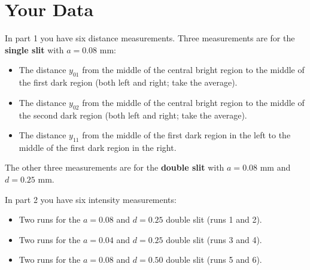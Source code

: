 \section{Your Data}
In part 1 you have six distance measurements. Three measurements are for the \textbf{single slit} with $a = 0.08$ mm:
\begin{itemize}
	\item The distance $y_{01}$ from the middle of the central bright region to the middle of the first dark region (both left and right; take the average).
	\item The distance $y_{02}$ from the middle of the central bright region to the middle of the second dark region (both left and right; take the average).
	\item The distance $y_{11}$ from the middle of the first dark region in the left to the middle of the first dark region in the right.
\end{itemize}
The other three measurements are for the \textbf{double slit} with $a = 0.08$ mm and $d = 0.25$ mm.

In part 2 you have six intensity measurements:
\begin{itemize}
	\item Two runs for the $a = 0.08$ and $d = 0.25$ double slit (runs 1 and 2).
	\item Two runs for the $a = 0.04$ and $d = 0.25$ double slit (runs 3 and 4).
	\item Two runs for the $a = 0.08$ and $d = 0.50$ double slit (runs 5 and 6).
\end{itemize}
\newpage
